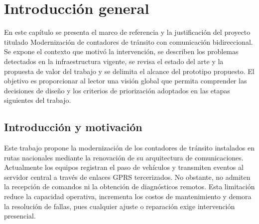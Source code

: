 
\chapter{Introducción general} %

\label{Chapter1} %
\label{IntroGeneral}


\newcommand{\keyword}[1]{\textbf{#1}}
\newcommand{\tabhead}[1]{\textbf{#1}}
\newcommand{\code}[1]{\texttt{#1}}
\newcommand{\file}[1]{\texttt{\bfseries#1}}
\newcommand{\option}[1]{\texttt{\itshape#1}}
\newcommand{\grados}{$^{\circ}$}

En este capítulo se presenta el marco de referencia y la justificación del proyecto titulado Modernización de contadores de tránsito con comunicación bidireccional. Se expone el contexto que motivó la intervención, se describen los problemas detectados en la infraestructura vigente, se revisa el estado del arte y la propuesta de valor del trabajo y se delimita el alcance del prototipo propuesto. El objetivo es proporcionar al lector una visión global que permita comprender las decisiones de diseño y los criterios de priorización adoptados en las etapas siguientes del trabajo.


\newpage

\section{Introducción y motivación}

Este trabajo propone la modernización de los contadores de tránsito instalados en rutas nacionales mediante la renovación de su arquitectura de comunicaciones. Actualmente los equipos registran el paso de vehículos y transmiten eventos al servidor central a través de enlaces GPRS tercerizados. No obstante, no admiten la recepción de comandos ni la obtención de diagnósticos remotos. Esta limitación reduce la capacidad operativa, incrementa los costos de mantenimiento y demora la resolución de fallas, pues cualquier ajuste o reparación exige intervención presencial.

